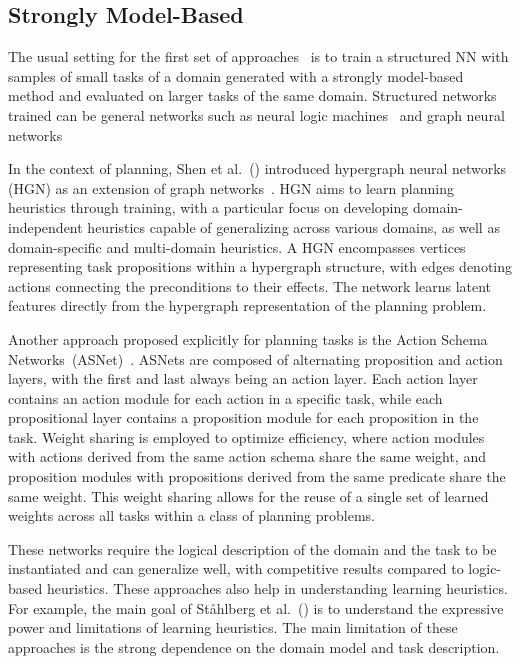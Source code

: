 \subsection{Strongly Model-Based}

The usual setting for the first set of approaches~\cite{Toyer.etal/2018,Shen.etal/2020,Toyer.etal/2020,Gehring.etal/2022,Stahlberg.etal/2022} is to train a structured NN with samples of small tasks of a domain generated with a strongly model-based method and evaluated on larger tasks of the same domain. Structured networks trained can be general networks such as neural logic machines~\cite{Dong.etal/2018} and graph neural networks~\cite{Gori.etal/2005,Scarselli.etal/2008}

In the context of planning, Shen et al.~(\citeyear{Shen.etal/2020}) introduced hypergraph neural networks (HGN) as an extension of graph networks~\cite{Battaglia.etal/2018}. HGN aims to learn planning heuristics through training, with a particular focus on developing domain-independent heuristics capable of generalizing across various domains, as well as domain-specific and multi-domain heuristics. A HGN encompasses vertices representing task propositions within a hypergraph structure, with edges denoting actions connecting the preconditions to their effects. The network learns latent features directly from the hypergraph representation of the planning problem.

Another approach proposed explicitly for planning tasks is the Action Schema Networks~(ASNet)~\cite{Toyer.etal/2018}. ASNets are composed of alternating proposition and action layers, with the first and last always being an action layer. Each action layer contains an action module for each action in a specific task, while each propositional layer contains a proposition module for each proposition in the task. Weight sharing is employed to optimize efficiency, where action modules with actions derived from the same action schema share the same weight, and proposition modules with propositions derived from the same predicate share the same weight. This weight sharing allows for the reuse of a single set of learned weights across all tasks within a class of planning problems.

These networks require the logical description of the domain and the task to be instantiated and can generalize well, with competitive results compared to logic-based heuristics. These approaches also help in understanding learning heuristics. For example, the main goal of St\aa hlberg et al.~(\citeyear{Stahlberg.etal/2022}) is to understand the expressive power and limitations of learning heuristics. The main limitation of these approaches is the strong dependence on the domain model and task description.

